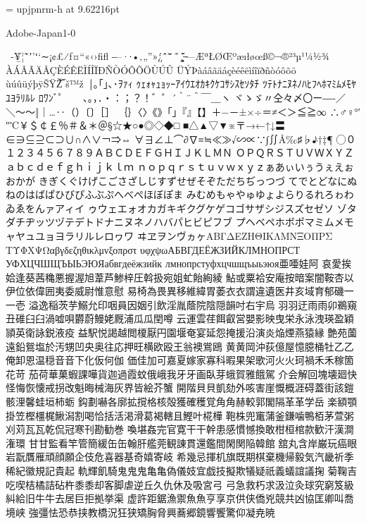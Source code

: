 %
%
%
\font\upjpnrm = upjpnrm-h at 9.62216pt
\upjpnrm

Adobe-Japan1-0

 ‑¥̲̀¦˜̃ʼ’ʻ‘∼¡¢£⁄ƒ¤“«‹›ﬁﬂ
‒–·∙•‚„”»¿́ˆ̂¯̄̆̇̈˚̊¸̧̨̋̌
̶—ÆªŁØŒºæıłøœß­©¬®²³µ¹¼½¾
ÀÁÂÃÄÅÇÈÉÊËÌÍÎÏÐÑÒÓÔÕÖÙÚÛ
ÜÝÞàáâãäåçèéêëìíîïðñòóôõö
ùúûüýþÿŠŸŽ̅‾š™ž ￨｡｢｣､･ｦｧｨ
ｩｪｫｬｭｮｯｰｱｲｳｴｵｶｷｸｹｺｻｼｽｾｿﾀﾁ
ﾂﾃﾄﾅﾆﾇﾈﾉﾊﾋﾌﾍﾎﾏﾐﾑﾒﾓﾔﾕﾖﾗﾘﾙﾚ
ﾛﾜﾝﾞﾟ 　、。，．・：；？！゛゜´｀¨＾￣＿ヽ
ヾゝゞ〃仝々〆〇ー―‐／＼〜～‖｜…‥（）〔〕［］
｛｝〈〉《》「」『』【】＋−－±×÷＝≠＜＞≦≧∞
∴♂♀°′″℃￥＄￠￡％＃＆＊＠§☆★○●◎◇◆□
■△▲▽▼※〒→←↑↓〓∈∋⊆⊇⊂⊃∪∩∧∨￢⇒⇔
∀∃∠⊥⌒∂∇≡≒≪≫√∽∝∵∫∬Å‰♯♭♪†‡¶
◯０１２３４５６７８９ＡＢＣＤＥＦＧＨＩＪＫＬＭＮ
ＯＰＱＲＳＴＵＶＷＸＹＺａｂｃｄｅｆｇｈｉｊｋｌｍ
ｎｏｐｑｒｓｔｕｖｗｘｙｚぁあぃいぅうぇえぉおかが
きぎくぐけげこごさざしじすずせぜそぞただちぢっつづ
てでとどなにぬねのはばぱひびぴふぶぷへべぺほぼぽま
みむめもゃやゅゆょよらりるれろゎわゐゑをんァアィイ
ゥウェエォオカガキギクグケゲコゴサザシジスズセゼソ
ゾタダチヂッツヅテデトドナニヌネノハバパヒビピフブ
プヘベペホボポマミムメモャヤュユョヨラリルレロヮワ
ヰヱヲンヴヵヶΑΒΓΔΕΖΗΘΙΚΛΜΝΞΟΠΡΣ
ΤΥΦΧΨΩαβγδεζηθικλμνξοπρστ
υφχψωАБВГДЕЁЖЗИЙКЛМНОПРСТ
УФХЦЧШЩЪЫЬЭЮЯабвгдеёжзийк
лмнопрстуфхцчшщъыьэюя亜唖娃阿
哀愛挨姶逢葵茜穐悪握渥旭葦芦鯵梓圧斡扱宛姐虻飴絢綾
鮎或粟袷安庵按暗案闇鞍杏以伊位依偉囲夷委威尉惟意慰
易椅為畏異移維緯胃萎⾐衣謂違遺医井亥域育郁磯⼀一壱
溢逸稲茨芋鰯允印咽員因姻引飲淫胤蔭院陰隠韻吋右宇烏
⽻羽迂⾬雨卯鵜窺丑碓⾅臼渦嘘唄欝蔚鰻姥厩浦⽠瓜閏噂
云運雲荏餌叡営嬰影映曳栄永泳洩瑛盈穎頴英衛詠鋭液疫
益駅悦謁越閲榎厭円園堰奄宴延怨掩援沿演炎焔煙燕猿縁
艶苑薗遠鉛鴛塩於汚甥凹央奥往応押旺横欧殴王翁襖鴬鴎
⻩黄岡沖荻億屋憶臆桶牡⼄乙俺卸恩温穏⾳音下化仮何伽
価佳加可嘉夏嫁家寡科暇果架歌河⽕火珂禍⽲禾稼箇花苛
茄荷華菓蝦課嘩貨迦過霞蚊俄峨我⽛牙画臥芽蛾賀雅餓駕
介会解回塊壊廻快怪悔恢懐戒拐改魁晦械海灰界皆絵芥蟹
開階⾙貝凱劾外咳害崖慨概涯碍蓋街該鎧骸浬馨蛙垣柿蛎
鈎劃嚇各廓拡撹格核殻獲確穫覚⾓角赫較郭閣隔⾰革学岳
楽額顎掛笠樫橿梶鰍潟割喝恰括活渇滑葛褐轄且鰹叶椛樺
鞄株兜竃蒲釜鎌噛鴨栢茅萱粥刈苅⽡瓦乾侃冠寒刊勘勧巻
喚堪姦完官寛⼲干幹患感慣憾換敢柑桓棺款歓汗漢澗潅環
⽢甘監看竿管簡緩⽸缶翰肝艦莞観諌貫還鑑間閑関陥韓館
舘丸含岸巌玩癌眼岩翫贋雁頑顔願企伎危喜器基奇嬉寄岐
希幾忌揮机旗既期棋棄機帰毅気汽畿祈季稀紀徽規記貴起
軌輝飢騎⻤⿁鬼⻲亀偽儀妓宜戯技擬欺犠疑祇義蟻誼議掬
菊鞠吉吃喫桔橘詰砧杵⿉黍却客脚虐逆丘久仇休及吸宮⼸
弓急救朽求汲泣灸球究窮笈級糾給旧⽜牛去居巨拒拠挙渠
虚許距鋸漁禦⿂魚亨享京供侠僑兇競共凶協匡卿叫喬境峡
強彊怯恐恭挟教橋況狂狭矯胸脅興蕎郷鏡響饗驚仰凝尭暁
